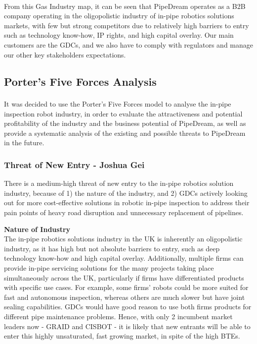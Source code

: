 \documentclass[11pt]{article}		%
\newcommand{\supercite}[1]{\textsuperscript{\cite{#1}}}		%
\begin{document}
        \\\hspace*{3ex}From this Gas Industry map, it can be seen that PipeDream operates as a B2B company operating in the oligopolistic industry of in-pipe robotics solutions markets, with few but strong competitors due to relatively high barriers to entry such as technology know-how, IP rights, and high capital overlay. Our main customers are the GDCs, and we also have to comply with regulators and manage our other key stakeholders expectations. 

		\subsection{Porter's Five Forces Analysis} \label{industryP5F}
			
			It was decided to use the Porter's Five Forces model\supercite{porter2008five} to analyse the in-pipe inspection robot industry, in order to evaluate the attractiveness and potential profitability of the industry and the business potential of PipeDream, as well as provide a systematic analysis of the existing and possible threats to PipeDream in the future.

			\subsubsection{Threat of New Entry - Joshua Gei}
			
			There is a medium-high threat of new entry to the in-pipe robotics solution industry, because of 1) the nature of the industry, and 2) GDCs actively looking out for more cost-effective solutions in robotic in-pipe inspection to address their pain points of heavy road disruption and unnecessary replacement of pipelines.
            
           \textbf{Nature of Industry} 
            \\The in-pipe robotics solutions industry in the UK is inherently an oligopolistic industry, as it has high but not absolute barriers to entry, such as deep technology know-how and high capital overlay. Additionally, multiple firms can provide in-pipe servicing solutions for the many projects taking place simultaneously across the UK, particularly if firms have differentiated products with specific use cases. For example, some firms’ robots could be more suited for fast and autonomous inspection, whereas others are much slower but have joint sealing capabilities. GDCs would have good reason to use both firms products for different pipe maintenance problems. Hence, with only 2 incumbent market leaders now - GRAID and CISBOT - it is likely that new entrants will be able to enter this highly unsaturated, fast growing market, in spite of the high BTEs.
         
\end{document}
